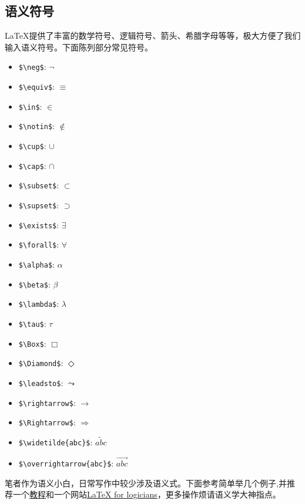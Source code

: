 \documentclass[a4paper,12pt]{article}
\begin{document}
\subsection{语义符号}

LaTeX提供了丰富的数学符号、逻辑符号、箭头、希腊字母等等，极大方便了我们输入语义符号。下面陈列部分常见符号。

\begin{multicols}{3}
	\begin{itemize}
		\item \verb|$\neg$|: $\neg$
		\item \verb|$\equiv$|: $\equiv$
		\item \verb|$\in$|: $\in$
		\item \verb|$\notin$|: $\notin$
		\item \verb|$\cup$|: $\cup$
		\item \verb|$\cap$|: $\cap$
		\item \verb|$\subset$|: $\subset$
		\item \verb|$\supset$|: $\supset$
		\item \verb|$\exists$|: $\exists$
		\item \verb|$\forall$|: $\forall$
		\item \verb|$\alpha$|: $\alpha$
		\item \verb|$\beta$|: $\beta$
		\item \verb|$\lambda$|: $\lambda$
		\item \verb|$\tau$|: $\tau$
		\item \verb|$\Box$|: $\Box$
		\item \verb|$\Diamond$|: $\Diamond$
		\item \verb|$\leadsto$|: $\leadsto$
		\item \verb|$\rightarrow$|: $\rightarrow$
		\item \verb|$\Rightarrow$|: $\Rightarrow$
		\item \verb|$\widetilde{abc}$|: $\widetilde{abc}$
		\item \verb|$\overrightarrow{abc}$|: $\overrightarrow{abc}$
	\end{itemize}
\end{multicols}

笔者作为语义小白，日常写作中较少涉及语义式。下面参考简单举几个例子,并推荐一个\href{https://www1.essex.ac.uk/linguistics/external/clmt/latex4ling/semantics/}{教程}和一个网站\href{http://www.logicmatters.net/latex-for-logicians/}{LaTeX for logicians}，更多操作烦请语义学大神指点。
\end{document}
